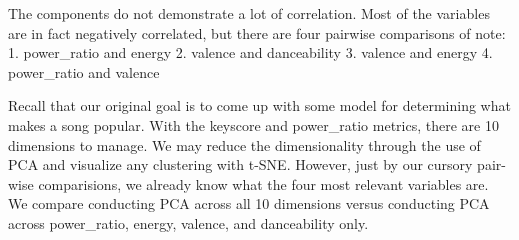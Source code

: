 \documentclass[11pt]{article}
\begin{document}
The components do not demonstrate a lot of correlation. Most of the
variables are in fact negatively correlated, but there are four pairwise
comparisons of note: 1. power\_ratio and energy 2. valence and
danceability 3. valence and energy 4. power\_ratio and valence

Recall that our original goal is to come up with some model for
determining what makes a song popular. With the keyscore and
power\_ratio metrics, there are 10 dimensions to manage. We may reduce
the dimensionality through the use of PCA and visualize any clustering
with t-SNE. However, just by our cursory pair-wise comparisions, we
already know what the four most relevant variables are. We compare
conducting PCA across all 10 dimensions versus conducting PCA across
power\_ratio, energy, valence, and danceability only.
\end{document}

